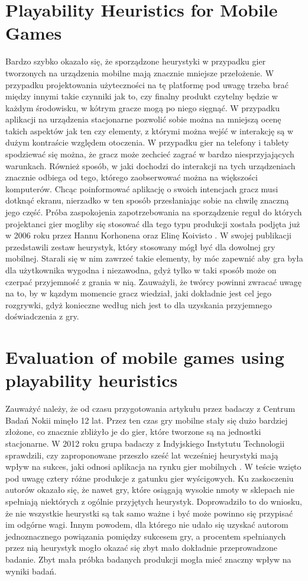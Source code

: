 \documentclass[a4paper,12pt,numbers=noenddot]{report}
\begin{document}
\section{Playability Heuristics for Mobile Games}
Bardzo szybko okazało się, że sporządzone heurystyki w przypadku gier tworzonych na urządzenia mobilne mają znacznie mniejsze przełożenie. W przypadku projektowania użyteczności na tę platformę pod uwagę trzeba brać między innymi takie czynniki jak to, czy finalny produkt czytelny będzie w każdym środowisku, w kótrym gracze mogą po niego sięgnąć. W przypadku aplikacji na urządzenia stacjonarne pozwolić sobie można na mniejszą ocenę takich aspektów jak ten czy elementy, z którymi można wejść w interakcję są w dużym kontraście względem otoczenia. W przypadku gier na telefony i tablety spodziewać się można, że gracz może zechcieć zagrać w bardzo niesprzyjających warunkach. Również sposób, w jaki dochodzi do interakcji na tych urządzeniach znacznie odbiega od tego, którego zaobserwować można na większości komputerów. Chcąc poinformować aplikację o swoich intencjach gracz musi dotknąć ekranu, nierzadko w ten sposób przesłaniając sobie na chwilę znaczną jego część. 
Próba zaspokojenia zapotrzebowania na sporządzenie reguł do których projektanci gier mogliby się stosować dla tego typu produkcji xostała podjęta już w 2006 roku przez Hannu Korhonena oraz Elinę Koivisto \cite{art_playabilityHeuristics}. W swojej publikacji przedstawili zestaw heurystyk, który stosowany mógł być dla dowolnej gry mobilnej. Starali się w nim zawrzeć takie elementy, by móc zapewnić aby gra była dla użytkownika wygodna i niezawodna, gdyż tylko w taki sposób może on czerpać przyjemność z grania w nią. Zauważyli, że twórcy powinni zwracać uwagę na to, by w kązdym momencie gracz wiedział, jaki dokładnie jest cel jego rozgrywki, gdyż konieczne według nich jest to dla uzyskania przyjemnego doświadczenia z gry.

\section{Evaluation of mobile games using playability heuristics}
Zauważyć należy, że od czasu przygotowania artykułu przez badaczy z Centrum Badań Nokii minęło 12 lat. Przez ten czas gry mobilne stały się dużo bardziej złożone, co znacznie zbliżyło je do gier, które tworzone są na jednostki stacjonarne. W 2012 roku grupa badaczy z Indyjskiego Instytutu Technologii sprawdzili, czy zaproponowane przeszło sześć lat wcześniej heurystyki mają wpływ na sukces, jaki odnosi aplikacja na rynku gier mobilnych  \cite{art_evaluationOfMG}. W teście wzięto pod uwagę cztery różne produkcje z gatunku gier wyścigowych. Ku zaskoczeniu autorów okazało się, że nawet gry, które osiągają wysokie nmoty w sklepach nie spełniają niektórych z ogólnie przyjętych heurystyk. Doprowadziło to do wniosku, że nie wszystkie heurystki są tak samo ważne i być może powinno się przypisać im odgórne wagi. Innym powodem, dla którego nie udało się uzyskać autorom jednoznacznego powiązania pomiędzy sukcesem gry, a procentem spełnianych przez nią heurystyk mogło okazać się zbyt mało dokładnie przeprowadzone badanie. Zbyt mała próbka badanych produkcji mogła mieć znaczny wpływ na wyniki badań.
\end{document}
